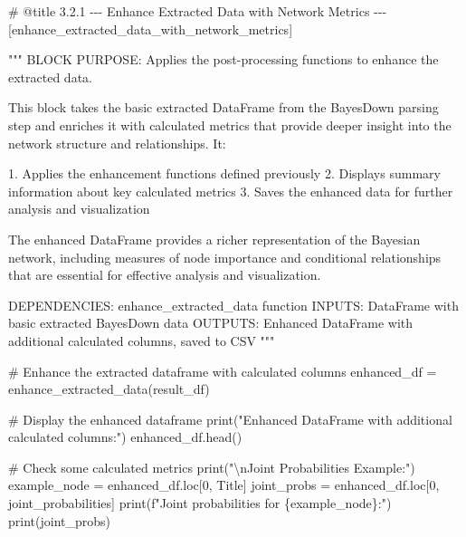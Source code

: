 \documentclass[
  11pt,
  letterpaper,
]{book}
\newenvironment{Shaded}{\begin{snugshade}}{\end{snugshade}}
\newcommand{\BuiltInTok}[1]{\textcolor[rgb]{0.00,0.23,0.31}{#1}}
\newcommand{\CharTok}[1]{\textcolor[rgb]{0.13,0.47,0.30}{#1}}
\newcommand{\CommentTok}[1]{\textcolor[rgb]{0.37,0.37,0.37}{#1}}
\newcommand{\DecValTok}[1]{\textcolor[rgb]{0.68,0.00,0.00}{#1}}
\newcommand{\NormalTok}[1]{\textcolor[rgb]{0.00,0.23,0.31}{#1}}
\newcommand{\OperatorTok}[1]{\textcolor[rgb]{0.37,0.37,0.37}{#1}}
\newcommand{\SpecialCharTok}[1]{\textcolor[rgb]{0.37,0.37,0.37}{#1}}
\newcommand{\SpecialStringTok}[1]{\textcolor[rgb]{0.13,0.47,0.30}{#1}}
\newcommand{\StringTok}[1]{\textcolor[rgb]{0.13,0.47,0.30}{#1}}
\begin{document}
\label{enhance_extracted_data_with_network_metrics}
\begin{Shaded}
\begin{Highlighting}[]
\CommentTok{\# @title 3.2.1 {-}{-}{-} Enhance Extracted Data with Network Metrics {-}{-}{-} [enhance\_extracted\_data\_with\_network\_metrics]}

\CommentTok{"""}
\CommentTok{BLOCK PURPOSE: Applies the post{-}processing functions to enhance the extracted data.}

\CommentTok{This block takes the basic extracted DataFrame from the BayesDown parsing step}
\CommentTok{and enriches it with calculated metrics that provide deeper insight into the}
\CommentTok{network structure and relationships. It:}

\CommentTok{1. Applies the enhancement functions defined previously}
\CommentTok{2. Displays summary information about key calculated metrics}
\CommentTok{3. Saves the enhanced data for further analysis and visualization}

\CommentTok{The enhanced DataFrame provides a richer representation of the Bayesian network,}
\CommentTok{including measures of node importance and conditional relationships that are}
\CommentTok{essential for effective analysis and visualization.}

\CommentTok{DEPENDENCIES: enhance\_extracted\_data function}
\CommentTok{INPUTS: DataFrame with basic extracted BayesDown data}
\CommentTok{OUTPUTS: Enhanced DataFrame with additional calculated columns, saved to CSV}
\CommentTok{"""}

\CommentTok{\# Enhance the extracted dataframe with calculated columns}
\NormalTok{enhanced\_df }\OperatorTok{=}\NormalTok{ enhance\_extracted\_data(result\_df)}

\CommentTok{\# Display the enhanced dataframe}
\BuiltInTok{print}\NormalTok{(}\StringTok{"Enhanced DataFrame with additional calculated columns:"}\NormalTok{)}
\NormalTok{enhanced\_df.head()}

\CommentTok{\# Check some calculated metrics}
\BuiltInTok{print}\NormalTok{(}\StringTok{"}\CharTok{\textbackslash{}n}\StringTok{Joint Probabilities Example:"}\NormalTok{)}
\NormalTok{example\_node }\OperatorTok{=}\NormalTok{ enhanced\_df.loc[}\DecValTok{0}\NormalTok{, }\StringTok{\textquotesingle{}Title\textquotesingle{}}\NormalTok{]}
\NormalTok{joint\_probs }\OperatorTok{=}\NormalTok{ enhanced\_df.loc[}\DecValTok{0}\NormalTok{, }\StringTok{\textquotesingle{}joint\_probabilities\textquotesingle{}}\NormalTok{]}
\BuiltInTok{print}\NormalTok{(}\SpecialStringTok{f"Joint probabilities for }\SpecialCharTok{\{}\NormalTok{example\_node}\SpecialCharTok{\}}\SpecialStringTok{:"}\NormalTok{)}
\BuiltInTok{print}\NormalTok{(joint\_probs)}


\end{Highlighting}
\end{Shaded}
\end{document}
